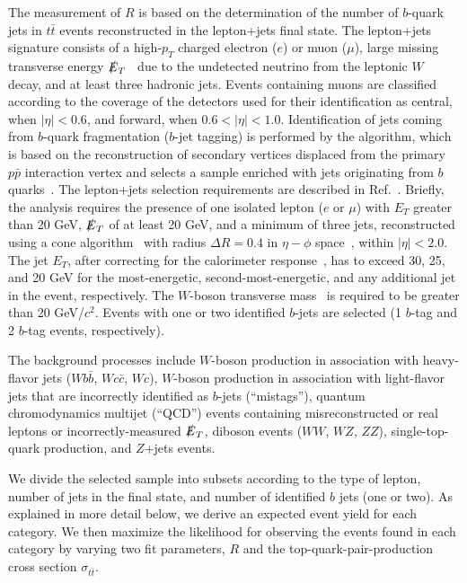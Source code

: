 \documentclass[aps,prd,twocolumn,superscriptaddress,showpacs]{revtex4}
\begin{document}
The measurement of $R$ is based on the determination of the number of $b$-quark jets in
$t \bar t$ events reconstructed in  the lepton+jets final state. 
The lepton+jets signature consists of a high-$p_{T}$ charged electron ($e$) or muon  ($\mu$),
large missing transverse energy $\slashed E_T$~\cite{coord} due to the undetected neutrino from the leptonic $W$ decay,
and at least three hadronic jets. Events containing  muons are classified according to the coverage of the
detectors used for their identification as central, when $| \eta | < 0.6$, and forward, when $0.6 < | \eta | < 1.0$.
Identification of jets coming from $b$-quark
fragmentation
 ($b$-jet tagging)
is performed by the {}
algorithm, which is based on the reconstruction of secondary vertices displaced from the
primary $p\bar{p}$ interaction vertex and selects a sample enriched  with jets
originating from $b$ quarks~\cite{cuts}. 
The lepton+jets selection requirements are described  in Ref.~\cite{cuts}.
Briefly, the analysis requires the presence of one isolated lepton ($e$ or $\mu$)
with $E_T$ greater than 20 GeV,  $\slashed E_{T}$ of at least 20 GeV, and
 a minimum of three jets, reconstructed using
a cone algorithm~\cite{JES} with radius $\Delta R = 0.4 $ in $\eta - \phi$ space~\cite{coord},
within $\left|\eta\right|< 2.0$. The jet $E_{T}$, after correcting for the calorimeter response~\cite{JES},
has to exceed 30, 25, and 20 GeV for the most-energetic, second-most-energetic, and any additional jet
in the event, respectively.
The $W$-boson transverse mass~\cite{coord} is required to be greater than
20 GeV/$c^{2}$. Events with one  or two  identified $b$-jets are selected (1 $b$-tag and 2 $b$-tag events, respectively).

The background processes include $W$-boson production in association with heavy-flavor jets 
($Wb\bar{b}$, $Wc\bar{c}$, $Wc$), $W$-boson production in association 
with light-flavor jets that are incorrectly identified as $b$-jets (``mistags''), quantum chromodynamics 
 multijet (``QCD'') events containing misreconstructed or
real leptons or incorrectly-measured $\slashed E_T$, diboson events ($WW$, $WZ$, $ZZ$),  
single-top-quark production, and $Z$+jets events.

We divide the selected sample into subsets according to the type of lepton, number
of jets in the final state, and number of identified  $b$ jets (one or two).
As explained in more detail below, we derive an expected event yield for each category. We then maximize the
likelihood for observing the events found in each category 
by varying two fit parameters, $R$ and the top-quark-pair-production
cross section $\sigma_{t\bar{t}}$.
\end{document}

